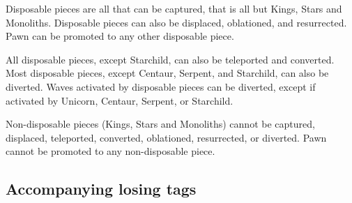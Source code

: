 Disposable pieces are all that can be captured, that is all but Kings, Stars and
Monoliths. Disposable pieces can also be displaced, oblationed, and resurrected.
Pawn can be promoted to any other disposable piece.

All disposable pieces, except Starchild, can also be teleported and converted.
Most disposable pieces, except Centaur, Serpent, and Starchild, can also be
diverted. Waves activated by disposable pieces can be diverted, except if
activated by Unicorn, Centaur, Serpent, or Starchild.

Non-disposable pieces (Kings, Stars and Monoliths) cannot be captured, displaced,
teleported, converted, oblationed, resurrected, or diverted. Pawn cannot be
promoted to any non-disposable piece.


\clearpage %

\subsection*{Accompanying losing tags}
\label{sec:Appendix/Summary/Accompanying-losing-tags}

